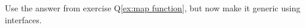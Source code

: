 \begin{Exercise}[title={Map function with interfaces},difficulty=6]
\label{ex:map function interfaces}
Use the answer from exercise Q\ref{ex:map function}, but now
make it generic using interfaces.
\end{Exercise}

\begin{Answer}

\end{Answer}


